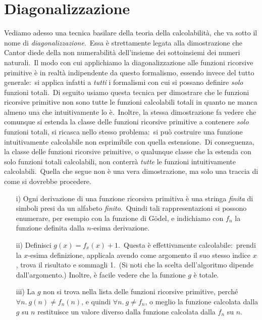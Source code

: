 \section{Diagonalizzazione}

Vediamo adesso una tecnica basilare della teoria della calcolabilità, che va sotto il nome di \textit{diagonalizzazione}.\
Essa è strettamente legata alla dimostrazione che Cantor diede della non numerabilità dell'insieme dei sottoinsiemi dei numeri naturali.\
Il modo con cui applichiamo la diagonalizzazione alle funzioni ricorsive primitive è in realtà indipendente da questo formalismo, essendo invece del tutto generale:\ si applica infatti a \textit{tutti} i formalismi con cui si possano definire \textit{solo} funzioni totali.\
Di seguito usiamo questa tecnica per dimostrare che le funzioni ricorsive primitive non sono tutte le funzioni calcolabili totali in quanto ne manca almeno una che intuitivamente lo è.\
Inoltre, la stessa dimostrazione fa vedere che comunque si estenda la classe delle funzioni ricorsive primitive a contenere \textit{solo} funzioni totali, si ricasca nello stesso problema:\ si può costruire una funzione intuitivamente calcolabile non esprimibile con quella estensione.\
Di conseguenza, la classe delle funzioni ricorsive primitive, o qualunque classe che la estenda con solo funzioni totali calcolabili, non conterrà \textit{tutte} le funzioni intuitivamente calcolabili.\
Quella che segue non è una vera dimostrazione, ma solo una traccia di come si dovrebbe procedere.

\begin{itemize}
    \item[i)] Ogni derivazione di una funzione ricorsiva primitiva è una stringa \textit{finita} di simboli presi da un alfabeto \textit{finito}.\
          Quindi tali rappresentazioni si possono enumerare, per esempio con la funzione di G\"odel, e indichiamo con $f_n$ la funzione definita dalla $n$-esima derivazione.
    \item[ii)] Definisci $g(x) = f_x (x) + 1$.\
          Questa è effettivamente calcolabile:\ prendi la $x$-esima definizione, applicala avendo come argomento il suo stesso indice $x$, trova il risultato e sommagli 1.\
          (Si noti che la scelta dell'algoritmo dipende dall'argomento.)
          Inoltre, è facile vedere che la funzione $g$ è totale.
    \item[iii)] La $g$ non si trova nella lista delle funzioni ricorsive primitive, perché $\forall n.\ g(n) \neq f_n(n)$, e quindi $\forall n.\ g \neq f_n$, o meglio la funzione calcolata dalla $g$ su $n$ restituisce un valore diverso dalla funzione calcolata dalla $f_n$ su $n$.
\end{itemize}


